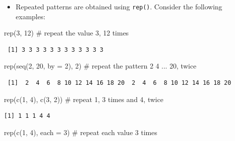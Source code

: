 \documentclass[
  9pt,
  a4paper,
  ignorenonframetext,
  notheorems]{beamer}
\newenvironment{Shaded}{\begin{snugshade}}{\end{snugshade}}
\newcommand{\AttributeTok}[1]{\textcolor[rgb]{0.40,0.45,0.13}{#1}}
\newcommand{\CommentTok}[1]{\textcolor[rgb]{0.37,0.37,0.37}{#1}}
\newcommand{\DecValTok}[1]{\textcolor[rgb]{0.68,0.00,0.00}{#1}}
\newcommand{\FunctionTok}[1]{\textcolor[rgb]{0.28,0.35,0.67}{#1}}
\newcommand{\NormalTok}[1]{\textcolor[rgb]{0.00,0.23,0.31}{#1}}
\providecommand{\tightlist}{%
  \setlength{\itemsep}{0pt}\setlength{\parskip}{0pt}}\usepackage{longtable,booktabs,array}
\begin{document}
\begin{frame}[fragile]
\begin{itemize}
\tightlist
\item
  Repeated patterns are obtained using \texttt{rep()}. Consider the
  following examples:
\end{itemize}

\begin{Shaded}
\begin{Highlighting}[]
\FunctionTok{rep}\NormalTok{(}\DecValTok{3}\NormalTok{, }\DecValTok{12}\NormalTok{) }\CommentTok{\# repeat the value 3, 12 times}
\end{Highlighting}
\end{Shaded}

\begin{verbatim}
 [1] 3 3 3 3 3 3 3 3 3 3 3 3
\end{verbatim}

\begin{Shaded}
\begin{Highlighting}[]
\FunctionTok{rep}\NormalTok{(}\FunctionTok{seq}\NormalTok{(}\DecValTok{2}\NormalTok{, }\DecValTok{20}\NormalTok{, }\AttributeTok{by =} \DecValTok{2}\NormalTok{), }\DecValTok{2}\NormalTok{) }\CommentTok{\# repeat the pattern 2 4 ... 20, twice}
\end{Highlighting}
\end{Shaded}

\begin{verbatim}
 [1]  2  4  6  8 10 12 14 16 18 20  2  4  6  8 10 12 14 16 18 20
\end{verbatim}

\begin{Shaded}
\begin{Highlighting}[]
\FunctionTok{rep}\NormalTok{(}\FunctionTok{c}\NormalTok{(}\DecValTok{1}\NormalTok{, }\DecValTok{4}\NormalTok{), }\FunctionTok{c}\NormalTok{(}\DecValTok{3}\NormalTok{, }\DecValTok{2}\NormalTok{)) }\CommentTok{\# repeat 1, 3 times and 4, twice}
\end{Highlighting}
\end{Shaded}

\begin{verbatim}
[1] 1 1 1 4 4
\end{verbatim}

\begin{Shaded}
\begin{Highlighting}[]
\FunctionTok{rep}\NormalTok{(}\FunctionTok{c}\NormalTok{(}\DecValTok{1}\NormalTok{, }\DecValTok{4}\NormalTok{), }\AttributeTok{each =} \DecValTok{3}\NormalTok{)  }\CommentTok{\# repeat each value 3 times}
\end{Highlighting}
\end{Shaded}


\end{frame}
\end{document}
